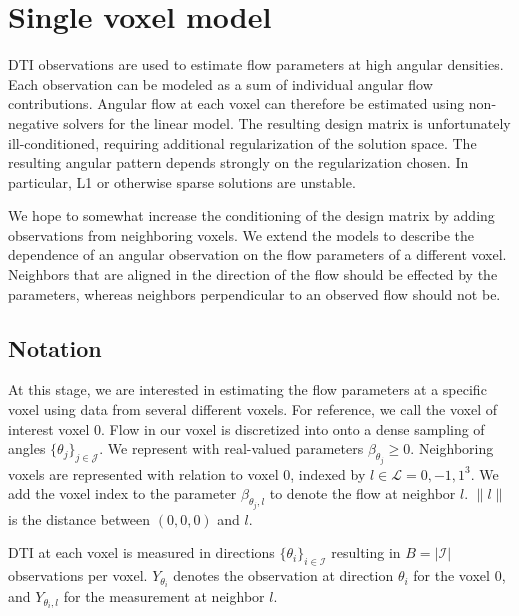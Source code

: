 \documentclass[11pt]{amsart}
\newcommand{\tj}{\theta_j}
\newcommand{\ti}{\theta_i}
\newcommand{\yti}{Y_{\theta_i}}
\newcommand{\ytil}{Y_{\theta_i,l}}
\begin{document}
\section{Single voxel model}
DTI observations are used to estimate flow parameters at high angular densities. 
Each observation can be modeled as a sum of individual angular flow contributions. 
Angular flow at each voxel can therefore be estimated using non-negative solvers for the linear model. 
The resulting design matrix is unfortunately ill-conditioned, requiring additional regularization of the solution space. 
The resulting angular pattern depends strongly on the regularization chosen. 
In particular, L1 or otherwise sparse solutions are unstable. 

We hope to somewhat increase the conditioning of the design matrix by adding observations 
from neighboring voxels. We extend the models to describe the dependence of 
an angular observation on the flow parameters of a different voxel. Neighbors 
that are aligned in the direction of the flow should be effected by the parameters,  
whereas neighbors perpendicular to an observed flow should not be. 

\subsection{Notation}

At this stage, we are interested in estimating the flow parameters at a 
specific voxel using data from several different voxels. 
For reference, we call the voxel of interest voxel 0. 
Flow in our voxel is discretized into onto a dense sampling of angles $\{\tj\}_{j \in \mathcal{J}}$. 
We represent with real-valued parameters $\beta_{\tj}\geq 0$.
Neighboring voxels are represented with relation to voxel $0$, indexed by $l \in \mathcal{L} = {0,-1,1}^3$. 
We add the voxel index to the parameter $\beta_{\tj, l}$ to denote the flow at neighbor $l$. 
$\|l\|$ is the distance between $(0,0,0)$ and $l$.

DTI at each voxel is measured in directions $\{\ti\}_{ i \in \mathcal{I}}$ resulting in  $B = |\mathcal{I}| $ observations per voxel.  
$\yti$ denotes the observation at direction $\ti$ for the voxel 0, and $\ytil$ for the 
measurement at neighbor $l$. 
\end{document}
